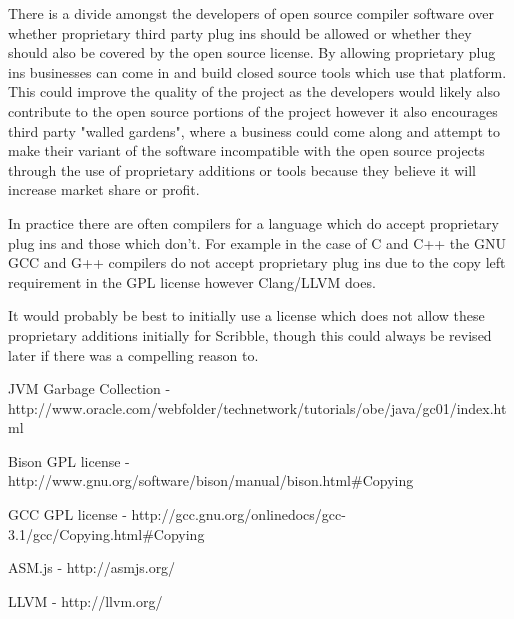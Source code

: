 \documentclass[]{final_report}
\begin{document}
There is a divide amongst the developers of open source compiler software over whether proprietary third party plug ins should be allowed or whether they should also be covered by the open source license. By allowing proprietary plug ins businesses can come in and build closed source tools which use that platform. This could improve the quality of the project as the developers would likely also contribute to the open source portions of the project however it also encourages third party "walled gardens", where a business could come along and attempt to make their variant of the software incompatible with the open source projects through the use of proprietary additions or tools because they believe it will increase market share or profit.

In practice there are often compilers for a language which do accept proprietary plug ins and those which don't. For example in the case of C and C++ the GNU GCC and G++ compilers do not accept proprietary plug ins due to the copy left requirement in the GPL license however Clang/LLVM does.

It would probably be best to initially use a license which does not allow these proprietary additions initially for Scribble, though this could always be revised later if there was a compelling reason to.

\newpage
\begin{thebibliography}{99}
JVM Garbage Collection - http://www.oracle.com/webfolder/technetwork/tutorials/obe/java/gc01/index.html
Bison GPL license - http://www.gnu.org/software/bison/manual/bison.html\#Copying
GCC GPL license - http://gcc.gnu.org/onlinedocs/gcc-3.1/gcc/Copying.html\#Copying
ASM.js - http://asmjs.org/
LLVM - http://llvm.org/
\end{thebibliography}
\label{endpage}
\end{document}
